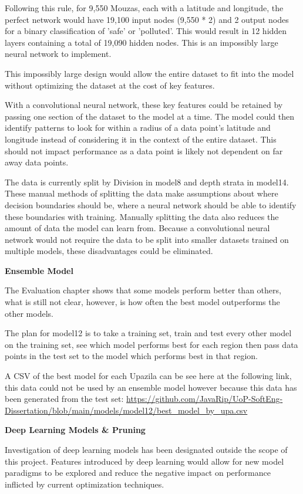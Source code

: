 Following this rule, for 9,550 Mouzas, each with a latitude and longitude, the perfect network would have 19,100 input nodes (9,550 * 2) and 2 output nodes for a binary classification of 'safe' or 'polluted'. This would result in 12 hidden layers containing a total of 19,090 hidden nodes. This is an impossibly large neural network to implement.

This impossibly large design would allow the entire dataset to fit into the model without optimizing the dataset at the cost of key features.

With a convolutional neural network, these key features could be retained by passing one section of the dataset to the model at a time. The model could then identify patterns to look for within a radius of a data point's latitude and longitude instead of considering it in the context of the entire dataset. This should not impact performance as a data point is likely not dependent on far away data points.

The data is currently split by Division in model8 and depth strata in model14. These manual methods of splitting the data make assumptions about where decision boundaries should be, where a neural network should be able to identify these boundaries with training. Manually splitting the data also reduces the amount of data the model can learn from. Because a convolutional neural network would not require the data to be split into smaller datasets trained on multiple models, these disadvantages could be eliminated.

\textbf{Ensemble Model}

The Evaluation chapter shows that some models perform better than others, what is still not clear, however, is how often the best model outperforms the other models.

The plan for model12 is to take a training set, train and test every other model on the training set, see which model performs best for each region then pass data points in the test set to the model which performs best in that region.

A CSV of the best model for each Upazila can be see here at the following link, this data could not be used by an ensemble model however because this data has been generated from the test set: \url{https://github.com/JavaRip/UoP-SoftEng-Dissertation/blob/main/models/model12/best_model_by_upa.csv}

\textbf{Deep Learning Models \& Pruning}

Investigation of deep learning models has been designated outside the scope of this project. Features introduced by deep learning would allow for new model paradigms to be explored and reduce the negative impact on performance inflicted by current optimization techniques.

